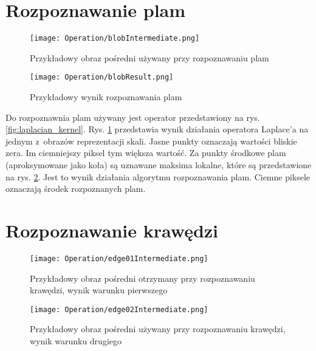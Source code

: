 \section{Rozpoznawanie plam}
\label{sec:dzialanieBlob}

\begin{figure}[h]
\begin{center}
\texttt{[image: Operation/blobIntermediate.png]}
\end{center}
\caption{Przykładowy obraz pośredni używany przy rozpoznawaniu plam}
\label{fig:blobIntermediate}
\end{figure}

\begin{figure}[h]
\begin{center}
\texttt{[image: Operation/blobResult.png]}
\end{center}
\caption{Przykładowy wynik rozpoznawania plam}
\label{fig:blobResult}
\end{figure}

Do rozpoznawnia plam używany jest operator przedstawiony na rys. \ref{fig:laplacian_kernel}. Rys. \ref{fig:blobIntermediate} przedstawia wynik działania operatora Laplace'a na jednym z~obrazów reprezentacji skali. Jasne punkty oznaczają wartości bliskie zera. Im ciemniejszy piksel tym większa wartość. Za punkty środkowe plam (aproksymowane jako koła) są uznawane maksima lokalne, które są przedstawione na rys. \ref{fig:blobResult}. Jest to wynik działania algorytmu rozpoznawania plam. Ciemne piksele oznaczają środek rozpoznanych plam.

\section{Rozpoznawanie krawędzi}
\label{sec:dzialanieEdge}

\begin{figure}[h]
\begin{center}
\texttt{[image: Operation/edge01Intermediate.png]}
\end{center}
\caption{Przykładowy obraz pośredni otrzymany przy rozpoznawaniu krawędzi, wynik warunku pierwszego}
\label{fig:edgeIntermediate1}
\end{figure}


\begin{figure}[h]
\begin{center}
\texttt{[image: Operation/edge02Intermediate.png]}
\end{center}
\caption{Przykładowy obraz pośredni używany przy rozpoznawaniu krawędzi, wynik warunku drugiego}
\label{fig:edgeIntermediate2}
\end{figure}

